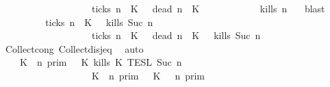 \begin{isabellebody}
\ \ \ \ \ \ \ \ \ \ \ \ \ \ \ \ \ {\isasymunion}\ {\isacharparenleft}{\isacharbraceleft}{\isasymrho}{\isachardot}\ {\isacharquery}ticks\ n\ {\isasymrho}\ K\ {\isasyminter}\ {\isacharbraceleft}{\isasymrho}{\isachardot}\ {\isacharquery}dead\ n\ {\isasymrho}\ K\isanewline
\ \ \ \ \ \ \ \ \ \ {\isasymsubseteq}\ {\isacharbraceleft}{\isasymrho}{\isachardot}\ {\isacharquery}kills\ n\ {\isasymrho}{\isacharbraceright}{\isacartoucheclose}\ \isamarkupfalse%
\ blast\isanewline
\ \ \isamarkupfalse%
\isanewline
\ \ \isamarkupfalse%
\ \isamarkupfalse%
\ {\isacartoucheopen}{\isachardot}{\isachardot}{\isachardot}\ {\isacharequal}\ {\isacharbraceleft}{\isasymrho}{\isachardot}\ {\isasymnot}\ {\isacharquery}ticks\ n\ {\isasymrho}\ K\ {\isasyminter}\ {\isacharbraceleft}{\isasymrho}{\isachardot}\ {\isacharquery}kills\ {\isacharparenleft}Suc\ n{\isacharparenright}\ {\isasymrho}{\isacharbraceright}\isanewline
\ \ \ \ \ \ \ \ \ \ \ \ \ \ \ \ \ {\isasymunion}\ {\isacharbraceleft}{\isasymrho}{\isachardot}\ {\isacharquery}ticks\ n\ {\isasymrho}\ K\ {\isasyminter}\ {\isacharbraceleft}{\isasymrho}{\isachardot}\ {\isacharquery}dead\ n\ {\isasymrho}\ K\ {\isasyminter}\ {\isacharbraceleft}{\isasymrho}{\isachardot}\ {\isacharquery}kills\ {\isacharparenleft}Suc\ n{\isacharparenright}\ {\isasymrho}{\isacharbraceright}{\isacartoucheclose}\isanewline
\ \ \ \ \isamarkupfalse%
\ Collect{\isacharunderscore}cong\ Collect{\isacharunderscore}disj{\isacharunderscore}eq\ \isamarkupfalse%
\ auto\isanewline
\ \ \isamarkupfalse%
\ \isamarkupfalse%
\ {\isacartoucheopen}{\isachardot}{\isachardot}{\isachardot}\ {\isacharequal}\ {\isasymlbrakk}\ K\ {\isasymnot}{\isasymUp}\ n\ {\isasymrbrakk}\isactrlsub p\isactrlsub r\isactrlsub i\isactrlsub m\ {\isasyminter}\ {\isasymlbrakk}\ K\ kills\ K\ {\isasymrbrakk}\isactrlsub T\isactrlsub E\isactrlsub S\isactrlsub L\isactrlbsup {\isasymge}\ Suc\ n\isactrlesup \isanewline
\ \ \ \ \ \ \ \ \ \ \ \ \ \ \ \ \ {\isasymunion}\ {\isasymlbrakk}\ K\ {\isasymUp}\ n\ {\isasymrbrakk}\isactrlsub p\isactrlsub r\isactrlsub i\isactrlsub m\ {\isasyminter}\ {\isasymlbrakk}\ K\ {\isasymnot}{\isasymUp}\ {\isasymge}\ n\ {\isasymrbrakk}\isactrlsub p\isactrlsub r\isactrlsub i\isactrlsub m\isanewline

\end{isabellebody}
